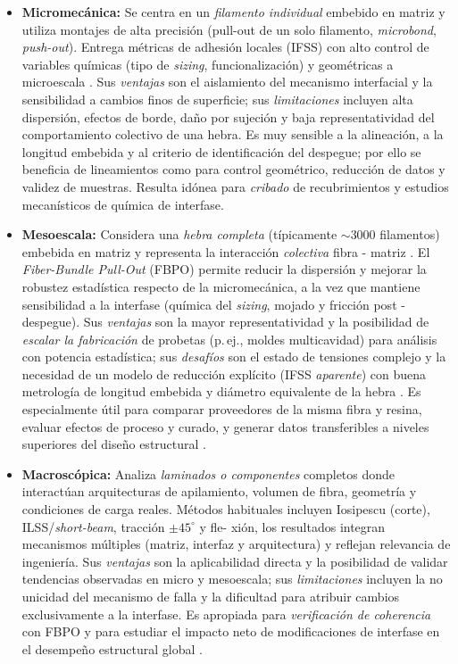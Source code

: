 \begin{itemize}
    \item \textbf{Micromecánica:} Se centra en un \emph{filamento individual} embebido en matriz y
	utiliza montajes de alta precisión (pull-out de un solo filamento, \textit{microbond},
	\textit{push-out}). Entrega métricas de adhesión locales (IFSS) con alto control de variables
	químicas (tipo de \textit{sizing}, funcionalización) y geométricas a microescala
	\cite{Miller1987,Ouyang2020}. Sus \emph{ventajas} son el aislamiento del mecanismo interfacial
	y la sensibilidad a cambios finos de superficie; sus \emph{limitaciones} incluyen alta dispersión,
	efectos de borde, daño por sujeción y baja representatividad del comportamiento colectivo de una
	hebra. Es muy sensible a la alineación, a la longitud embebida y al criterio de identificación del
	despegue; por ello se beneficia de lineamientos como \cite{ISO19375,DINSPEC19289} para control
	geométrico, reducción de datos y validez de muestras. Resulta idónea para \emph{cribado} de
	recubrimientos y estudios mecanísticos de química de interfase.

    \item \textbf{Mesoescala:} Considera una \emph{hebra completa} (típicamente \(\sim\)3000 filamentos)
	embebida en matriz y representa la interacción \emph{colectiva} fibra - matriz \cite{DeLeon2022}.
	El \textit{Fiber-Bundle Pull-Out} (FBPO) permite reducir la dispersión y mejorar la robustez
	estadística respecto de la micromecánica, a la vez que mantiene sensibilidad a la interfase
	(química del \textit{sizing}, mojado y fricción post - despegue). Sus \emph{ventajas} son la mayor
	representatividad y la posibilidad de \emph{escalar la fabricación} de probetas (p.\,ej., moldes
	multicavidad) para análisis con potencia estadística; sus \emph{desafíos} son el estado de
	tensiones complejo y la necesidad de un modelo de reducción explícito (IFSS \emph{aparente}) con
	buena metrología de longitud embebida y diámetro equivalente de la hebra
	\cite{Fischer2020,Liu2021}. Es especialmente útil para comparar proveedores de la misma fibra y
	resina, evaluar efectos de proceso y curado, y generar datos transferibles a niveles superiores
	del diseño estructural \cite{DeLeon2022}.

    \item \textbf{Macroscópica:} Analiza \emph{laminados o componentes} completos donde interactúan
	arquitecturas de apilamiento, volumen de fibra, geometría y condiciones de carga reales. Métodos
	habituales incluyen Iosipescu (corte), ILSS/\textit{short-beam}, tracción \(\pm45^\circ\) y
	fle- xión, los resultados integran mecanismos múltiples (matriz, interfaz y arquitectura) y
	reflejan relevancia de ingeniería. Sus \emph{ventajas} son la aplicabilidad directa y la
	posibilidad de validar tendencias observadas en micro y mesoescala; sus \emph{limitaciones}
	incluyen la no unicidad del mecanismo de falla y la dificultad para atribuir cambios
	exclusivamente a la interfase. Es apropiada para \emph{verificación de coherencia} con FBPO y
	para estudiar el impacto neto de modificaciones de interfase en el desempeño estructural global
	\cite{Liu2021,Fischer2020}.
\end{itemize}

